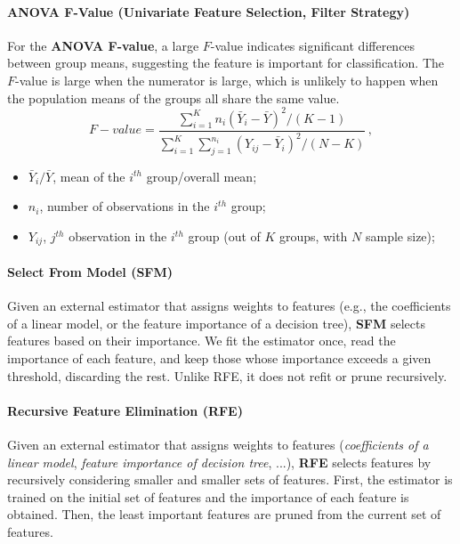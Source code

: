 \paragraph{ANOVA F-Value (Univariate Feature Selection, Filter Strategy)}
For the \textbf{ANOVA F-value}, a large $F$-value indicates significant differences between group means, suggesting the feature is important for classification. The $F$-value is large when the numerator is large, which is unlikely to happen when the population means of the groups all share the same value.
\begin{equation}
    F-value = \dfrac{\sum_{i=1}^K n_i(\bar{Y}_i - \bar{Y})^2 / (K-1)}{\sum_{i=1}^K \sum_{j=1}^{n_i} (Y_{ij} - \bar{Y}_i)^2 / (N-K)} \,,
\end{equation}
\begin{itemize}
  \item $\bar{Y}_i/\bar{Y}$, mean of the $i^{th}$ group/overall mean;
  \item $n_i$, number of observations in the $i^{th}$ group;
  \item $Y_{ij}$, $j^{th}$ observation in the $i^{th}$ group (out of $K$ groups, with $N$ sample size);
\end{itemize}

\paragraph{Select From Model (SFM)}
Given an external estimator that assigns weights to features (e.g., the coefficients of a linear model, or the feature importance of a decision tree), \textbf{SFM} selects features based on their importance. We fit the estimator once, read the importance of each feature, and keep those whose importance exceeds a given threshold, discarding the rest. Unlike RFE, it does not refit or prune recursively.

\paragraph{Recursive Feature Elimination (RFE)}
Given an external estimator that assigns weights to features (\textit{coefficients of a linear model}, \textit{feature importance of decision tree}, ...), \textbf{RFE} selects features by recursively considering smaller and smaller sets of features. First, the estimator is trained on the initial set of features and the importance of each feature is obtained. Then, the least important features are pruned from the current set of features.



